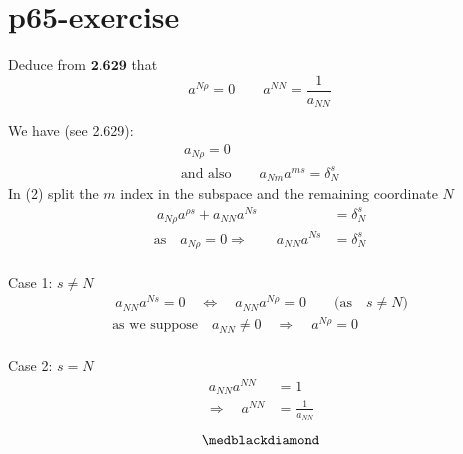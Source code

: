 \section{p65-exercise}
\begin{tcolorbox}
Deduce from $\textbf{2.629}$ that $$a^{N \rho} = 0  \quad\quad a^{NN} = \frac{1}{a_{NN}}$$
\end{tcolorbox}
We have (see 2.629):
\begin{align}
\ a_{N\rho} =0\\
\text{and also}\quad\quad a_{Nm}a^{ms} = \delta^s_N
\end{align}
In (2) split the $m$ index in the subspace and the remaining coordinate $N$
\begin{align}
\ a_{N\rho}a^{\rho s} +  a_{NN}a^{N s} &= \delta^s_N\\
\text{as}\quad a_{N\rho} =0 \Rightarrow \quad\quad a_{NN}a^{N s} &= \delta^s_N
\end{align}\\
Case 1: $s\ne N$
\begin{align}
\  a_{NN}a^{N s} =0 \quad \Leftrightarrow \quad a_{NN}a^{N \rho} =0 \quad\quad \text{(as}\quad s\ne N \text{)}\\
\text{as we suppose}\quad a_{NN}\ne 0 \quad \Rightarrow \quad a^{N \rho} =0
\end{align}\\

Case 2: $s= N$
\begin{align}
\  a_{NN}a^{N N} &=1 \\
\Rightarrow \quad a^{N N} &=\frac{1}{a_{NN}}
\end{align}
$$\medblackdiamond$$
\newpage

